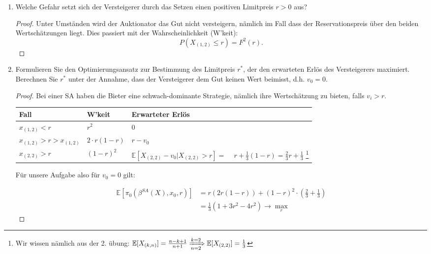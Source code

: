 \documentclass[12pt]{extreport} %
\theoremstyle{named}
\theoremstyle{nnamed}
\theoremstyle{itshape}
\theoremstyle{normal}
\begin{document}
\begin{enumerate}
	\item Welche Gefahr setzt sich der Versteigerer durch das Setzen einen positiven Limitpreis $r > 0$ aus?
		\begin{proof}
			Unter Umständen wird der Auktionator das Gut nicht versteigern, nämlich im Fall dass der Reservationspreis über den beiden Wertschätzungen liegt. Dies passiert mit der Wahrscheinlichkeit (W'keit):
			$$ P(X_{(1, 2)} \leq r) = F^{2}(r). $$
		\end{proof}
	\item Formulieren Sie den Optimierungsansatz zur Bestimmung des Limitpreis $r^{*}$, der den erwarteten Erlös des Versteigerers maximiert. Berechnen Sie $r^{*}$ unter der Annahme, dass der Versteigerer dem Gut keinen Wert beimisst, d.h. $v_{0} = 0$.
		\begin{proof}
			Bei einer SA haben die Bieter eine schwach-dominante Strategie, nämlich ihre Wertschätzung zu bieten, falls $v_{i} > r$.
			\begin{center}
    \begin{tabular}{| l | l | l |}
    \hline
    Fall & W'keit & Erwarteter Erlös  \\ \hline
    $x_{(1,2)} < r$ & $r^{2}$ & $0$  \\ \hline
    $x_{(1, 2)} > r > x_{(1, 2)} $ & $2 \cdot r (1 - r)$ & $r - v_{0}$  \\ \hline
    $x_{(2, 2)} > r$ & $(1-r)^{2} $  &  \pbox{20cm}{$\mathbb{E}[X_{(2,2)} - v_{0} \big| X_{(2,2)} > r] =$ \\ ~\hspace{0.25cm} $r + \frac{1}{3} (1-r) = \frac{2}{3} r + \frac{1}{3}$} \footnote{Wir wissen nämlich aus der 2. übung: $\mathbb{E}[X_{(k, n)}] = \frac{n - k +1}{n+1} \xRightarrow[n=2]{k=2} \mathbb{E}[X_{(2,2)}] = \frac{1}{3}$}  \\ 
    \hline
    \end{tabular}
    \end{center}
   
    Für unsere Aufgabe also für $v_{0} = 0$ gilt:
    
    \begin{align*}
    	\mathbb{E}[\pi_{0}(\beta^{SA}(X), x_{0}, r)] & = r\left(2r (1-r)\right) + (1-r)^{2} \cdot \left( \frac{2}{3} + \frac{1}{3} \right) \\
    		& = \frac{1}{3}  \left( 1 + 3 r^{2} - 4 r^{2} \right) \longrightarrow \max_{r}
    \end{align*}


\end{proof}
\end{enumerate}
\end{document}
